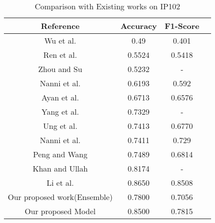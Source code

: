 \begin{table}[!htbp]
\centering
\begin{tabular}{|c|c|c|c|}
\hline
\textbf{Reference} & \textbf{Accuracy} & \textbf{F1-Score}\\
\hline
Wu et al.\cite{wu2019ip102} & 0.49 & 0.401\\
Ren et al.\cite{ren2019feature} & 0.5524 & 0.5418\\
Zhou and Su\cite{zhou2020efficient} & 0.5232 & -\\
Nanni et al.\cite{nanni2020insect} & 0.6193 & 0.592\\
Ayan et al.\cite{ayan2020crop} & 0.6713 & 0.6576\\
Yang et al.\cite{yang2021automated} & 0.7329 & -\\
Ung et al.\cite{ung2021efficient} & 0.7413 & 0.6770\\
Nanni et al.\cite{nanni2022high} & 0.7411 & 0.729\\
Peng and Wang\cite{peng2022cnn} & 0.7489 & 0.6814\\
Khan and Ullah\cite{khan2022deep} & 0.8174 & -\\
Li et al.\cite{li2022image} & 0.8650 & 0.8508\\
Our proposed work(Ensemble) & 0.7800 & 0.7056\\
Our proposed Model & 0.8500 & 0.7815\\
\hline
\end{tabular}
\caption{Comparison with Existing works on IP102}
\end{table}